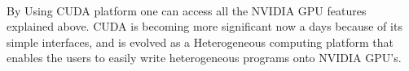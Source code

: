 \paragraph*{}By Using CUDA platform one can access all the NVIDIA GPU features explained above. CUDA is becoming more significant now a days because of its simple interfaces, and is evolved as a Heterogeneous computing platform that enables the users to easily write heterogeneous programs onto NVIDIA GPU’s.